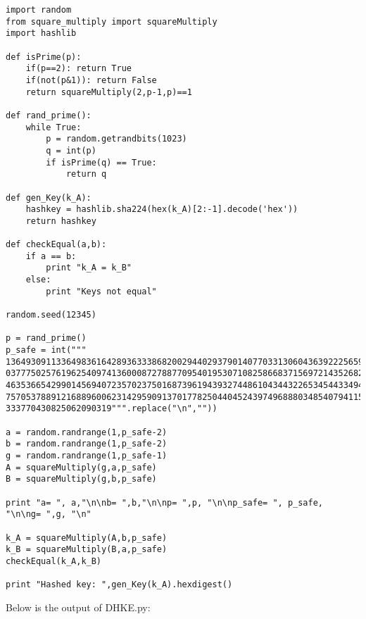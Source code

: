 \documentclass{article}
\begin{document}
\begin{framed}
\begin{verbatim}
import random
from square_multiply import squareMultiply
import hashlib

def isPrime(p):
    if(p==2): return True
    if(not(p&1)): return False
    return squareMultiply(2,p-1,p)==1

def rand_prime():
    while True:
        p = random.getrandbits(1023)
        q = int(p)
        if isPrime(q) == True:
            return q

def gen_Key(k_A):
    hashkey = hashlib.sha224(hex(k_A)[2:-1].decode('hex'))
    return hashkey

def checkEqual(a,b):
    if a == b:
        print "k_A = k_B"
    else:
        print "Keys not equal"

random.seed(12345)

p = rand_prime()
p_safe = int("""
136493091133649836164289363338682002944029379014077033130604363922256595
037775025761962540974136000872788770954019530710825866837156972143526820\
463536654299014569407235702375016873961943932744861043443226534544334946\
757053788912168896006231429590913701778250440452439749688803485407941150\
333770430825062090319""".replace("\n",""))

a = random.randrange(1,p_safe-2)
b = random.randrange(1,p_safe-2)
g = random.randrange(1,p_safe-1)
A = squareMultiply(g,a,p_safe)
B = squareMultiply(g,b,p_safe)

print "a= ", a,"\n\nb= ",b,"\n\np= ",p, "\n\np_safe= ", p_safe, "\n\ng= ",g, "\n"

k_A = squareMultiply(A,b,p_safe)
k_B = squareMultiply(B,a,p_safe)
checkEqual(k_A,k_B)

print "Hashed key: ",gen_Key(k_A).hexdigest()

\end{verbatim}
\end{framed}

Below is the output of DHKE.py:
\end{document}
